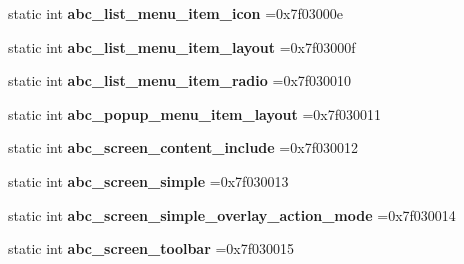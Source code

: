\begin{DoxyCompactItemize}
\item 
\mbox{\label{classandroid_1_1support_1_1design_1_1R_1_1layout_ace391b66f47be660d22db08c23dd9bef}} 
static int {\bfseries abc\+\_\+list\+\_\+menu\+\_\+item\+\_\+icon} =0x7f03000e
\item 
\mbox{\label{classandroid_1_1support_1_1design_1_1R_1_1layout_a35341683b1e7f25a1469c90aee7d9e3d}} 
static int {\bfseries abc\+\_\+list\+\_\+menu\+\_\+item\+\_\+layout} =0x7f03000f
\item 
\mbox{\label{classandroid_1_1support_1_1design_1_1R_1_1layout_a5c489fa7b2ca4b8a1dd3d02156dce354}} 
static int {\bfseries abc\+\_\+list\+\_\+menu\+\_\+item\+\_\+radio} =0x7f030010
\item 
\mbox{\label{classandroid_1_1support_1_1design_1_1R_1_1layout_a4ff1e36b95774a1e30dd918f1d97ac6c}} 
static int {\bfseries abc\+\_\+popup\+\_\+menu\+\_\+item\+\_\+layout} =0x7f030011
\item 
\mbox{\label{classandroid_1_1support_1_1design_1_1R_1_1layout_adb66ec355e19a7853808861d5226c410}} 
static int {\bfseries abc\+\_\+screen\+\_\+content\+\_\+include} =0x7f030012
\item 
\mbox{\label{classandroid_1_1support_1_1design_1_1R_1_1layout_aabf09b58f2b69c198ecb77f478d17b01}} 
static int {\bfseries abc\+\_\+screen\+\_\+simple} =0x7f030013
\item 
\mbox{\label{classandroid_1_1support_1_1design_1_1R_1_1layout_ac0f3478677d30fadc16de60b565ec324}} 
static int {\bfseries abc\+\_\+screen\+\_\+simple\+\_\+overlay\+\_\+action\+\_\+mode} =0x7f030014
\item 
\mbox{\label{classandroid_1_1support_1_1design_1_1R_1_1layout_ab0338416ad509277daf2ccca3d93c295}} 
static int {\bfseries abc\+\_\+screen\+\_\+toolbar} =0x7f030015
\item 

\end{DoxyCompactItemize}
